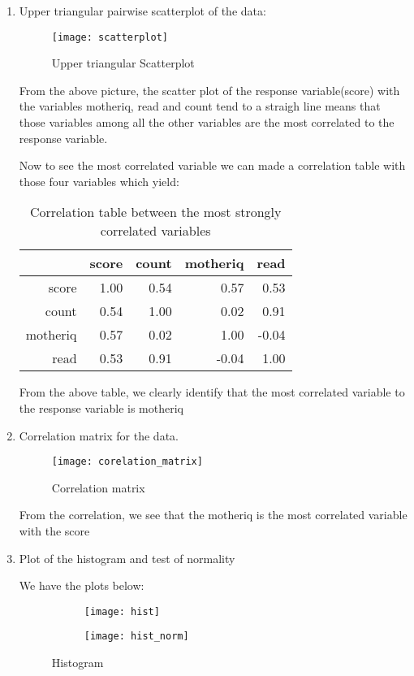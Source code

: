 \documentclass[12pt,a4paper]{article}
\begin{document}
\begin{enumerate}
	\item Upper triangular pairwise scatterplot of the data:
	\begin{figure}[H]
		\centering
		\texttt{[image: scatterplot]}
		\caption{Upper triangular Scatterplot}
	\end{figure}
	
From the above picture, the scatter plot of the response variable(score) with the variables motheriq, read and count tend to a straigh line means that those variables among all the other variables are the most correlated to the response variable.

Now to see the most correlated variable we can made a correlation table with those four variables which yield: 

\begin{table}[ht]
	\centering
	\caption{Correlation table between the most strongly correlated variables}
	\begin{tabular}{rrrrr}
		\hline
		& score & count & motheriq & read \\ 
		\hline
		score & 1.00 & 0.54 & 0.57 & 0.53 \\ 
		count & 0.54 & 1.00 & 0.02 & 0.91 \\ 
		motheriq & 0.57 & 0.02 & 1.00 & -0.04 \\ 
		read & 0.53 & 0.91 & -0.04 & 1.00 \\ 
		\hline
	\end{tabular}
\end{table}
	
From the above table, we clearly identify that the most correlated variable to the response variable is motheriq	
	
\item Correlation matrix for the data.
\begin{figure}[H]
	\centering
	\texttt{[image: corelation\_matrix]}
	\caption{Correlation matrix}
\end{figure}
From the correlation, we see that the motheriq is the most correlated variable with the score

\item Plot of the histogram and test of normality	

We have the plots below:

\begin{figure}[H]
	\centering
	\begin{subfigure}[b]{0.4\textwidth}
		\centering
		\texttt{[image: hist]}
	\end{subfigure}
		\begin{subfigure}[b]{0.4\textwidth}
		\centering
		\texttt{[image: hist\_norm]}
	\end{subfigure}
\caption{Histogram}
\end{figure}
	

\end{enumerate}
\end{document}
